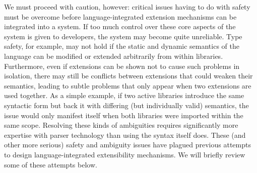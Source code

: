 We must proceed with caution, however: critical issues having to do with {safety} must be overcome before language-integrated extension mechanisms can be integrated into a system. If too much control over  these core aspects of the system is given  to developers, the system may become quite unreliable. 
Type safety, for example, may not hold if the static and dynamic semantics of the language can be modified or extended arbitrarily from within libraries. Furthermore, even if extensions can be shown not to cause such problems in isolation, there may still be conflicts between extensions that could weaken their semantics, leading to subtle problems that only appear when two extensions are used together. As a simple example, if two active libraries introduce the same syntactic form but back it with differing (but individually valid) semantics, the issue would only manifest itself when both libraries were imported within the same scope. Resolving these kinds of ambiguities requires significantly more expertise with parser technology than using the syntax itself does. These (and other more serious) safety and ambiguity issues have plagued previous attempts to design language-integrated extensibility mechanisms. We will briefly review some of these attempts below.%





